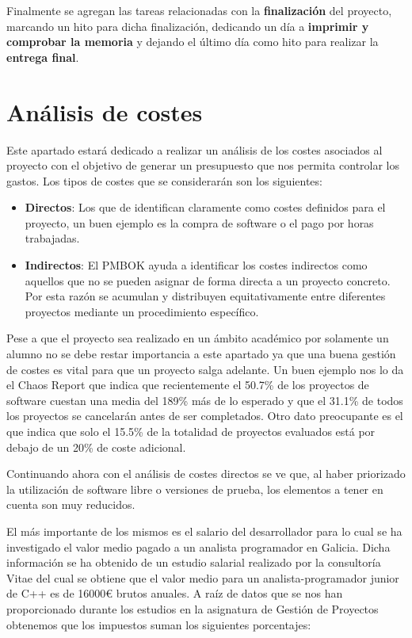 \bigskip

Finalmente se agregan las tareas relacionadas con la \textbf{finalización} del proyecto, marcando un hito para dicha finalización, dedicando un día a \textbf{imprimir y comprobar la memoria} y dejando el último día como hito para realizar la \textbf{entrega final}.



\section{Análisis de costes}

Este apartado estará dedicado a realizar un análisis de los costes asociados al proyecto con el objetivo de generar un presupuesto que nos permita controlar los gastos. Los tipos de costes que se considerarán son los siguientes:

\begin{itemize}
	\item \textbf{Directos}: Los que de identifican claramente como costes definidos para el proyecto, un buen ejemplo es la compra de software o el pago por horas trabajadas.
	\item \textbf{Indirectos}: El PMBOK\cite{pmbok} ayuda a identificar los costes indirectos como aquellos que no se pueden asignar de forma directa a un proyecto concreto. Por esta razón se acumulan y distribuyen equitativamente entre diferentes proyectos mediante un procedimiento específico.
\end{itemize}

Pese a que el proyecto sea realizado en un ámbito académico por solamente un alumno no se debe restar importancia a este apartado ya que una buena gestión de costes es vital para que un proyecto salga adelante. Un buen ejemplo nos lo da el Chaos Report\cite{chaos} que indica que recientemente el 50.7\% de los proyectos de software cuestan una media del 189\% más de lo esperado y que el 31.1\% de todos los proyectos se cancelarán antes de ser completados. Otro dato preocupante es el que indica que solo el 15.5\% de la totalidad de proyectos evaluados está por debajo de un 20\% de coste adicional.

\bigskip

Continuando ahora con el análisis de costes directos se ve que, al haber priorizado la utilización de software libre o versiones de prueba, los elementos a tener en cuenta son muy reducidos.

\bigskip 

El más importante de los mismos es el salario del desarrollador para lo cual se ha investigado el valor medio pagado a un analista programador en Galicia. Dicha información se ha obtenido de un estudio salarial realizado por la consultoría Vitae\cite{vitae}  del cual se obtiene que el valor medio para un analista-programador junior de C++ es de 16000\euro{} brutos anuales. A raíz de datos que se nos han proporcionado durante los estudios en la asignatura de Gestión de Proyectos obtenemos que los impuestos suman los siguientes porcentajes: 

